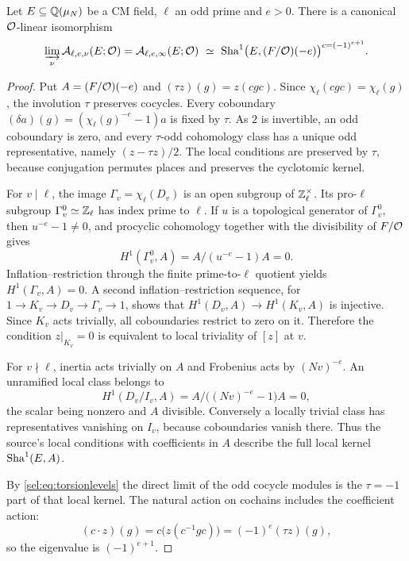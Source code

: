 \begin{theorem}\label{sel:thm:oddsha}
Let $E\subseteq\mathbb{Q}(\mu_N)$ be a CM field, $\ell$ an odd prime and $e>0$.
There is a canonical $\mathcal{O}$-linear isomorphism
\[
 \varinjlim_\nu\mathcal{A}_{\ell,e,\nu}(E;\mathcal{O})=\mathcal{A}_{\ell,e,\infty}(E;\mathcal{O})
 \ \simeq\ \operatorname{Sha}^1\bigl(E,(F/\mathcal{O})(-e)\bigr)^{c=(-1)^{e+1}} .
\]
\end{theorem}

\begin{proof}
Put $A=(F/\mathcal{O})(-e)$ and $(\tau z)(g)=z(cgc)$. Since
$\chi_\ell(cgc)=\chi_\ell(g)$, the involution $\tau$ preserves cocycles.
Every coboundary $(\delta a)(g)=(\chi_\ell(g)^{-e}-1)a$ is fixed by $\tau$.
As $2$ is invertible, an odd coboundary is zero, and every $\tau$-odd
cohomology class has a unique odd representative, namely $(z-\tau z)/2$.
The local conditions are preserved by $\tau$, because conjugation permutes
places and preserves the cyclotomic kernel.

For $v\mid\ell$, the image $\Gamma_v=\chi_\ell(D_v)$ is an open subgroup of
$\mathbb{Z}_\ell^\times$. Its pro-$\ell$ subgroup $\Gamma_v^0\simeq\mathbb{Z}_\ell$ has
index prime to $\ell$. If $u$ is a topological generator of $\Gamma_v^0$,
then $u^{-e}-1\ne0$, and procyclic cohomology together with the
divisibility of $F/\mathcal{O}$ gives
\[
 H^1(\Gamma_v^0,A)=A/(u^{-e}-1)A=0 .
\]
Inflation--restriction through the finite prime-to-$\ell$ quotient yields
$H^1(\Gamma_v,A)=0$. A second inflation--restriction sequence, for
$1\to K_v\to D_v\to\Gamma_v\to1$, shows that
$H^1(D_v,A)\to H^1(K_v,A)$ is injective. Since $K_v$ acts trivially, all
coboundaries restrict to zero on it. Therefore the condition $z|_{K_v}=0$
is equivalent to local triviality of $[z]$ at $v$.

For $v\nmid\ell$, inertia acts trivially on $A$ and Frobenius acts by
$(Nv)^{-e}$. An unramified local class belongs to
\[
 H^1(D_v/I_v,A)=A/\bigl((Nv)^{-e}-1\bigr)A=0,
\]
the scalar being nonzero and $A$ divisible. Conversely a locally trivial
class has representatives vanishing on $I_v$, because coboundaries vanish
there. Thus the source's local conditions with coefficients in $A$ describe
the full local kernel $\operatorname{Sha}^1(E,A)$.

By \eqref{sel:eq:torsionlevels} the direct limit of the odd cocycle modules
is the $\tau=-1$ part of that local kernel. The natural action on cochains
includes the coefficient action:
\[
 (c\cdot z)(g)=c\bigl(z(c^{-1}gc)\bigr)=(-1)^e(\tau z)(g),
\]
so the eigenvalue is $(-1)^{e+1}$.
\end{proof}

